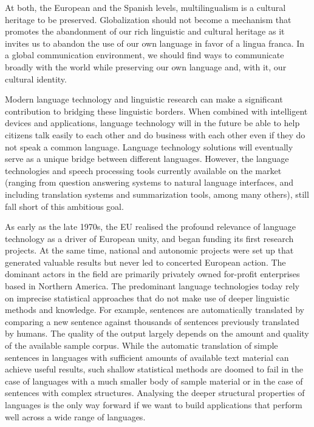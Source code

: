 \begin{multicols}{2}

At both, the European and the Spanish levels, multilingualism is a cultural heritage to be preserved. Globalization should not become a mechanism that promotes the abandonment of our rich linguistic and cultural heritage as it invites us to abandon the use of our own language in favor of a lingua franca. In a global communication environment, we should find ways to communicate broadly with the world while preserving our own language and, with it, our cultural identity.

Modern language technology and linguistic research can make a significant contribution to bridging these linguistic borders. When combined with intelligent devices and applications, language technology will in the future be able to help citizens talk easily to each other and do business with each other even if they do not speak a common language. Language technology solutions will eventually serve as a unique bridge between different languages. However, the language technologies and speech processing tools currently available on the market (ranging from question answering systems to natural language interfaces, and including translation systems and summarization tools, among many others), still fall short of this ambitious goal. 


As early as the late 1970s, the EU realised the profound relevance of language technology as a driver of European unity, and began funding its first research projects. At the same time, national and autonomic projects were set up that generated valuable results but never led to concerted European action. The dominant actors in the field are primarily privately owned for-profit enterprises based in Northern America. The predominant language technologies today rely on imprecise statistical approaches that do not make use of deeper linguistic methods and knowledge. For example, sentences are automatically translated by comparing a new sentence against thousands of sentences previously translated by humans. The quality of the output largely depends on the amount and quality of the available sample corpus. While the automatic translation of simple sentences in languages with sufficient amounts of available text material can achieve useful results, such shallow statistical methods are doomed to fail in the case of languages with a much smaller body of sample material or in the case of sentences with complex structures. Analysing the deeper structural properties of languages is the only way forward if we want to build applications that perform well across a wide range of languages.


\end{multicols}
